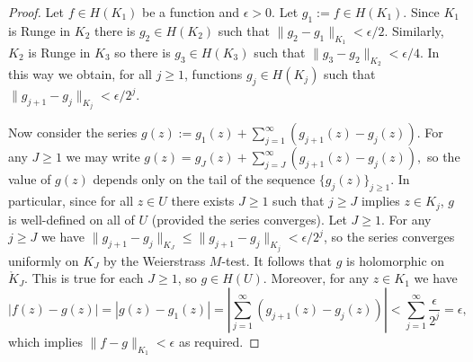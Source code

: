 \documentclass[11pt,a4paper, final, twoside]{article}
\numberwithin{equation}{section}
\newcommand{\inter}[1]{\mathring{#1}}
\newcommand{\hol}{H}
\begin{document}
\begin{proof}
Let $f\in\hol(K_1)$ be a function and $\epsilon>0$. Let $g_1:=f\in\hol(K_1)$. Since $K_1$ is Runge in $K_2$ there is
$g_2\in\hol(K_2)$ such that $\|g_2-g_1\|_{K_1}<\epsilon/2$. Similarly, $K_2$ is Runge in $K_3$ so there is $g_3\in\hol(K_3)$ such that $\|g_3-g_2\|_{K_2}<\epsilon/4$. In this way
we obtain, for all $j\geq 1$, functions $g_j\in\hol(K_j)$ such that $\|g_{j+1}-g_{j}\|_{K_j}<\epsilon/2^j$.

Now consider the series $g(z):=g_1(z)+\sum_{j=1}^\infty (g_{j+1}(z)-g_j(z))$. 
For any $J\geq 1$ we may write 
$ g(z)=
g_J(z)+\sum_{j=J}^\infty (g_{j+1}(z)-g_j(z)),$
so the value of $g(z)$ depends only on the tail of the sequence $\{g_j(z)\}_{j\geq 1}$. 
In particular, since for all $z\in U$ there exists $J\geq 1$ such that $j\geq J$ implies $z\in K_j$, $g$ is well-defined on all of $U$ (provided the series converges). 
Let $J\geq 1$. 
For any $j\geq J$ we have $\|g_{j+1}-g_j\|_{K_J}\leq \|g_{j+1}-g_j\|_{K_j}<\epsilon/2^j$, so the series converges uniformly on $K_J$ by the Weierstrass $M$-test.
It follows that $g$ is holomorphic on $\inter K_J$. This is true for each $J\geq 1$, so $g\in\hol(U)$.
Moreover, for any $z\in K_1$ we have
$$ |f(z)-g(z)|=|g(z)-g_1(z)|=\left|\sum_{j=1}^\infty (g_{j+1}(z)-g_j(z))\right|< \sum_{j=1}^\infty \frac{\epsilon}{2^j}=\epsilon,$$
which implies $\|f-g\|_{K_1}<\epsilon$ as required.
\end{proof}
\end{document}
